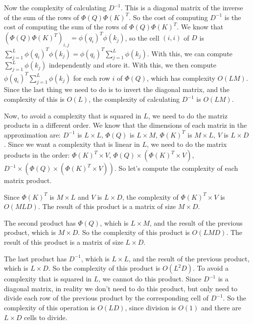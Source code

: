 \documentclass{article}
\begin{document}
\bigskip

Now the complexity of calculating $D^{-1}$. This is a diagonal matrix of the inverse of the sum of the rows of $\Phi(Q) \Phi(K)^T$. So the cost of computing $D^{-1}$ is the cost
of computing the sum of the rows of $\Phi(Q) \Phi(K)^T$. We know that $(\Phi(Q) \Phi(K)^T)_{i,j} = \phi(q_i)^T \phi(k_j)$, so the cell $(i,i)$ of $D$ 
is $\sum_{j=1}^L \phi(q_i)^T \phi(k_j) = \phi(q_i)^T \sum_{j=1}^L \phi(k_j)$. With this, we can compute $\sum_{j=1}^L \phi(k_j)$ independently and store it.
With this, we then compute $\phi(q_i)^T \sum_{j=1}^L \phi(k_j)$ for each row $i$ of $\Phi(Q)$, which has complexity $O(L M)$. Since the last thing we need to do is 
to invert the diagonal matrix, and the complexity of this is $O(L)$, the complexity of calculating $D^{-1}$ is $O(L M)$.

\bigskip

Now, to avoid a complexity that is squared in $L$, we need to do the matriz products in a different order. We know that the dimensions of each matriz in the approximation are:
$D^{-1}$ is $L\times L$, $\Phi(Q)$ is $L\times M$, $\Phi(K)^T$ is $M\times L$, $V$ is $L\times D$. Since we want a complexity that is linear in $L$, we need to do the matrix products in the order:
$\Phi(K)^T \times V$, $\Phi(Q) \times (\Phi(K)^T \times V)$, $D^{-1} \times (\Phi(Q) \times (\Phi(K)^T \times V))$. So let's compute the complexity of each matrix product.

\bigskip

Since $\Phi(K)^T$ is $M\times L$ and $V$ is $L\times D$, the complexity of $\Phi(K)^T \times V$ is $O(M L D)$. The result of this product is a matrix of size $M\times D$.

The second product has $\Phi(Q)$, which is $L\times M$, and the result of the previous product, which is $M\times D$. So the complexity of this product is $O(L M D)$. 
The result of this product is a matrix of size $L\times D$.

The last product has $D^{-1}$, which is $L\times L$, and the result of the previous product, which is $L\times D$. So the complexity of this product is $O(L^2 D)$. 
To avoid a complexity that is squared in $L$, we cannot do this product. Since $D^{-1}$ is a diagonal matrix, in reality we don't need to do this product, but only need to divide
each row of the previous product by the corresponding cell of $D^{-1}$. So the complexity of this operation is $O(L D)$, since division is $O(1)$ and there are 
$L \times D$ cells to divide.
\end{document}
